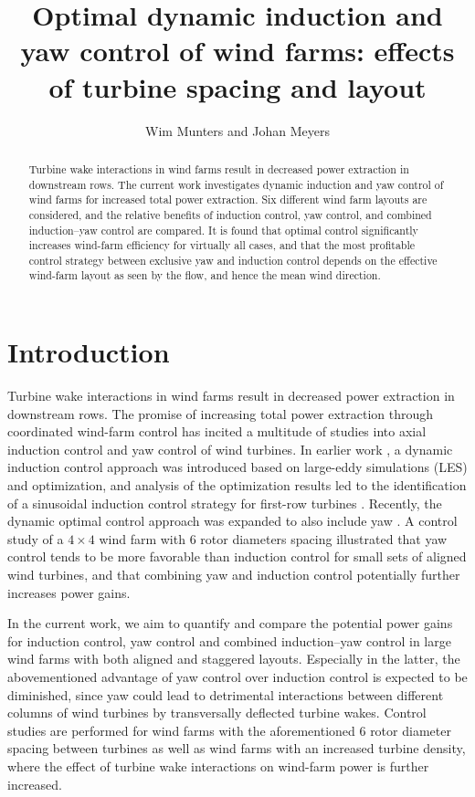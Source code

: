 \documentclass[a4paper]{jpconf}
\begin{document}
\title{Optimal dynamic induction and yaw control of wind farms: effects of turbine spacing and layout}

\author{Wim Munters and Johan Meyers}

\address{Department of Mechanical Engineering, KU Leuven, Celestijnenlaan 300A, B3001 Leuven, Belgium}


\begin{abstract}
Turbine wake interactions in wind farms result in decreased power extraction in downstream rows. The current work investigates dynamic induction and yaw control of wind farms for increased total power extraction. Six different wind farm layouts are considered, and the relative benefits of induction control, yaw control, and combined induction--yaw control are compared. It is found that optimal control significantly increases wind-farm efficiency for virtually all cases, and that the most profitable control strategy between exclusive yaw and induction control depends on the effective wind-farm layout as seen by the flow, and hence the mean wind direction. 
\end{abstract}

\section{Introduction}
Turbine wake interactions in wind farms result in decreased power extraction in downstream rows. The promise of increasing total power extraction
through coordinated wind-farm control has incited a multitude of studies into axial induction control and yaw control of wind turbines. In earlier
work \cite{goit, munters}, a dynamic induction control approach was introduced based on large-eddy simulations (LES)  and optimization, and analysis of the optimization results led to the identification of a sinusoidal induction control strategy for first-row turbines \cite{munterswes}. Recently, the dynamic optimal control approach was expanded to also include yaw \cite{muntersenergies}. A control study of a $4 \times 4$ wind farm with 6 rotor diameters spacing illustrated that yaw control tends to be more favorable than induction control for small sets of aligned wind turbines, and that combining yaw and induction control potentially further increases power gains. 

In the current work, we aim to quantify and compare the potential power gains for induction control, yaw control and combined induction--yaw control in large wind farms with both aligned and staggered layouts. Especially in the latter, the abovementioned advantage of yaw control over induction control is expected to be diminished, since yaw could lead to detrimental interactions between different columns of wind turbines by transversally deflected turbine wakes. Control studies are performed for wind farms with the aforementioned 6 rotor diameter spacing between turbines as well as wind farms with an increased turbine density, where the effect of turbine wake interactions on wind-farm power is further increased.  
\end{document}
